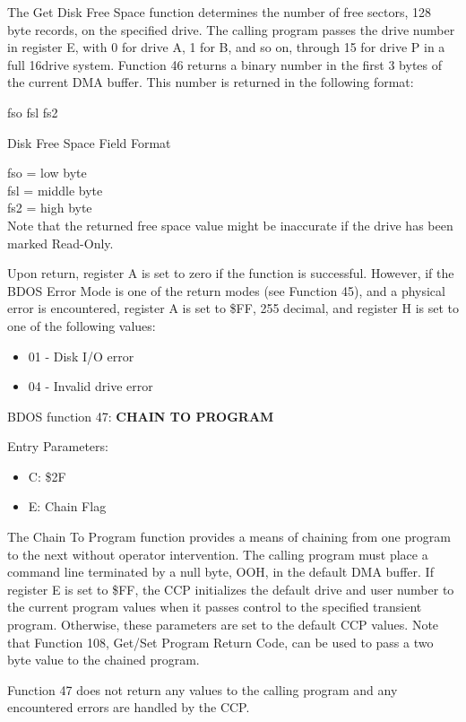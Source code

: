 The Get Disk Free Space function determines the number of free
sectors, 128 byte records, on the specified drive. The calling program
passes the drive number in register E, with 0 for drive A, 1 for B,
and so on, through 15 for drive P in a full 16drive system. Function
46 returns a binary number in the first 3 bytes of the current DMA
buffer. This number is returned in the following format:

fso fsl fs2

Disk Free Space Field Format

fso = low byte\\ fsl = middle byte\\ fs2 = high byte\\

Note that the returned free space value might be inaccurate if the
drive has been marked Read-Only.

Upon return, register A is set to zero if the function is
successful. However, if the BDOS Error Mode is one of the return modes
(see Function 45), and a physical error is encountered, register A is
set to \$FF, 255 decimal, and register H is set to one of the
following values:

\begin{itemize}
\item 01 - Disk I/O error
\item 04 - Invalid drive error
\end{itemize}

BDOS function 47: \textbf{CHAIN TO PROGRAM}

Entry Parameters:
\begin{itemize}
\item[] C: \$2F
\item[] E: Chain Flag
\end{itemize}

The Chain To Program function provides a means of chaining from one
program to the next without operator intervention. The calling program
must place a command line terminated by a null byte, OOH, in the
default DMA buffer. If register E is set to \$FF, the CCP initializes
the default drive and user number to the current program values when
it passes control to the specified transient program. Otherwise, these
parameters are set to the default CCP values. Note that Function 108,
Get/Set Program Return Code, can be used to pass a two byte value to
the chained program.

Function 47 does not return any values to the calling program and any
encountered errors are handled by the CCP.

